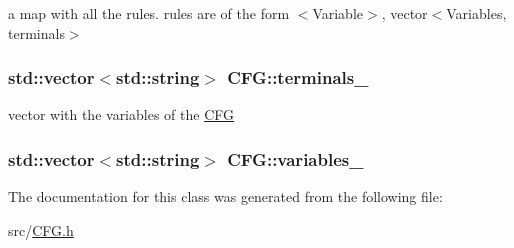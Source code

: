 a map with all the rules. rules are of the form $<$\-Variable$>$, vector$<$\-Variables, terminals$>$ 

\hypertarget{classCFG_ac105b578d6237fc6ff28e54c98bbb1b8}{
\subsubsection[{terminals\-\_\-}]{\setlength{\rightskip}{0pt plus 5cm}std\-::vector$<$std\-::string$>$ C\-F\-G\-::terminals\-\_\-\hspace{0.3cm}{\ttfamily [protected]}}}\label{classCFG_ac105b578d6237fc6ff28e54c98bbb1b8}


vector with the variables of the \hyperlink{classCFG}{C\-F\-G} 

\hypertarget{classCFG_a7369373d17b20520d7b72d43f471cda9}{
\subsubsection[{variables\-\_\-}]{\setlength{\rightskip}{0pt plus 5cm}std\-::vector$<$std\-::string$>$ C\-F\-G\-::variables\-\_\-\hspace{0.3cm}{\ttfamily [protected]}}}\label{classCFG_a7369373d17b20520d7b72d43f471cda9}


The documentation for this class was generated from the following file\-:\begin{DoxyCompactItemize}
\item 
src/\hyperlink{CFG_8h}{C\-F\-G.\-h}\end{DoxyCompactItemize}
